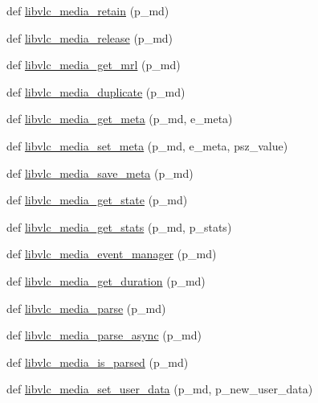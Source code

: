 \begin{DoxyCompactItemize}
\item 
def \hyperlink{namespacesrc_1_1lib_1_1vlc_a57e8f6b7adaabf15b0f6d7e38e27406a}{libvlc\+\_\+media\+\_\+retain} (p\+\_\+md)
\item 
def \hyperlink{namespacesrc_1_1lib_1_1vlc_ada7ee54bb4e75ff8011720c41522208a}{libvlc\+\_\+media\+\_\+release} (p\+\_\+md)
\item 
def \hyperlink{namespacesrc_1_1lib_1_1vlc_aad4a3db69969fd4074c2bf1006d35297}{libvlc\+\_\+media\+\_\+get\+\_\+mrl} (p\+\_\+md)
\item 
def \hyperlink{namespacesrc_1_1lib_1_1vlc_a5e64350e224502f453571378875fbc5f}{libvlc\+\_\+media\+\_\+duplicate} (p\+\_\+md)
\item 
def \hyperlink{namespacesrc_1_1lib_1_1vlc_a0ea9ad0ffdc05cbc7b06a808beb7c35b}{libvlc\+\_\+media\+\_\+get\+\_\+meta} (p\+\_\+md, e\+\_\+meta)
\item 
def \hyperlink{namespacesrc_1_1lib_1_1vlc_a232753fb3efafac7ed401878d83d70d5}{libvlc\+\_\+media\+\_\+set\+\_\+meta} (p\+\_\+md, e\+\_\+meta, psz\+\_\+value)
\item 
def \hyperlink{namespacesrc_1_1lib_1_1vlc_a9b62ca3e076f7a719a231e8431b15898}{libvlc\+\_\+media\+\_\+save\+\_\+meta} (p\+\_\+md)
\item 
def \hyperlink{namespacesrc_1_1lib_1_1vlc_af053bcb2056bfde60cd7b188808bcb6a}{libvlc\+\_\+media\+\_\+get\+\_\+state} (p\+\_\+md)
\item 
def \hyperlink{namespacesrc_1_1lib_1_1vlc_a896d27b81be0bd3bbb5e26d01405519b}{libvlc\+\_\+media\+\_\+get\+\_\+stats} (p\+\_\+md, p\+\_\+stats)
\item 
def \hyperlink{namespacesrc_1_1lib_1_1vlc_a30172314b3480019204b9a591aa31039}{libvlc\+\_\+media\+\_\+event\+\_\+manager} (p\+\_\+md)
\item 
def \hyperlink{namespacesrc_1_1lib_1_1vlc_abda99a25e08db0f764f471e159485a0c}{libvlc\+\_\+media\+\_\+get\+\_\+duration} (p\+\_\+md)
\item 
def \hyperlink{namespacesrc_1_1lib_1_1vlc_a42a731fdce1156f594c2515b9d1b6fdc}{libvlc\+\_\+media\+\_\+parse} (p\+\_\+md)
\item 
def \hyperlink{namespacesrc_1_1lib_1_1vlc_af25454e8ba273be262cb35ecc3ecf279}{libvlc\+\_\+media\+\_\+parse\+\_\+async} (p\+\_\+md)
\item 
def \hyperlink{namespacesrc_1_1lib_1_1vlc_a9ab7862ac30a4a8d3f01b258ce17fa79}{libvlc\+\_\+media\+\_\+is\+\_\+parsed} (p\+\_\+md)
\item 
def \hyperlink{namespacesrc_1_1lib_1_1vlc_a7e57902cc23e9927fc9ad8771882551b}{libvlc\+\_\+media\+\_\+set\+\_\+user\+\_\+data} (p\+\_\+md, p\+\_\+new\+\_\+user\+\_\+data)

\end{DoxyCompactItemize}
